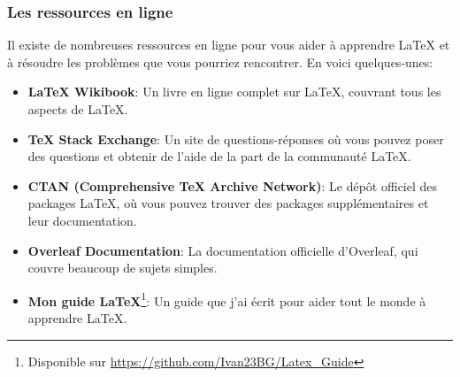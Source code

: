 \subsubsection{Les ressources en ligne}\label{subsubsec:online_resources}
Il existe de nombreuses ressources en ligne pour vous aider à apprendre LaTeX et à résoudre les problèmes que vous pourriez rencontrer.
En voici quelques-unes:
\begin{itemize}
    \item \textbf{LaTeX Wikibook}: Un livre en ligne complet sur LaTeX, couvrant tous les aspects de LaTeX.
    \item \textbf{TeX Stack Exchange}: Un site de questions-réponses où vous pouvez poser des questions et obtenir de l'aide de la part de la communauté LaTeX.
    \item \textbf{CTAN (Comprehensive TeX Archive Network)}: Le dépôt officiel des packages LaTeX, où vous pouvez trouver des packages supplémentaires et leur documentation.
    \item \textbf{Overleaf Documentation}: La documentation officielle d'Overleaf, qui couvre beaucoup de sujets simples.
    \item \textbf{Mon guide LaTeX}\footnote{Disponible sur \href{https://github.com/Ivan23BG/Latex_Guide}{\url{https://github.com/Ivan23BG/Latex_Guide}}}: Un guide que j'ai écrit pour aider tout le monde à apprendre LaTeX.
\end{itemize}